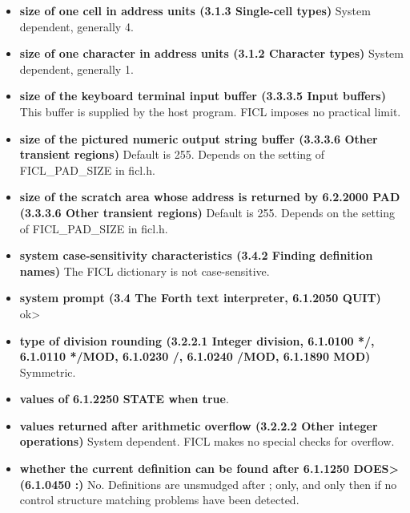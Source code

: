 \begin{itemize}[noitemsep]
	\item \textbf{size of one cell in address units (3.1.3
		Single-cell types)}\newline
	System dependent, generally 4.

	\item \textbf{size of one character in address units (3.1.2
		Character types)}\newline
	System dependent, generally 1.

	\item \textbf{size of the keyboard terminal input buffer
		(3.3.3.5 Input buffers)}\newline
	This buffer is supplied by the host program. FICL imposes no
	practical limit.

	\item \textbf{size of the pictured numeric output string buffer
		(3.3.3.6 Other transient regions)}\newline
	Default is 255. Depends on the setting of FICL\_PAD\_SIZE in
	ficl.h.

	\item \textbf{size of the scratch area whose address is returned
		by 6.2.2000 PAD (3.3.3.6 Other transient regions)}\newline
	Default is 255. Depends on the setting of FICL\_PAD\_SIZE in
	ficl.h.

	\item \textbf{system case-sensitivity characteristics (3.4.2
		Finding definition names)}\newline
	The FICL dictionary is not case-sensitive.

	\item \textbf{system prompt (3.4 The Forth text interpreter,
		6.1.2050 QUIT)}\newline
	ok\textgreater

	\item \textbf{type of division rounding (3.2.2.1 Integer
		division, 6.1.0100 */, 6.1.0110 */MOD, 6.1.0230 /,
		6.1.0240 /MOD, 6.1.1890 MOD)}\newline
	Symmetric.

	\item \textbf{values of 6.1.2250 STATE when true}.

	\item \textbf{values returned after arithmetic overflow (3.2.2.2
		Other integer operations)}\newline
	System dependent. FICL makes no special checks for overflow.

	\item \textbf{whether the current definition can be found after
		6.1.1250 DOES\textgreater (6.1.0450 :)}\newline
	No. Definitions are unsmudged after ; only, and only then if no
	control structure matching problems have been detected.
\end{itemize}


